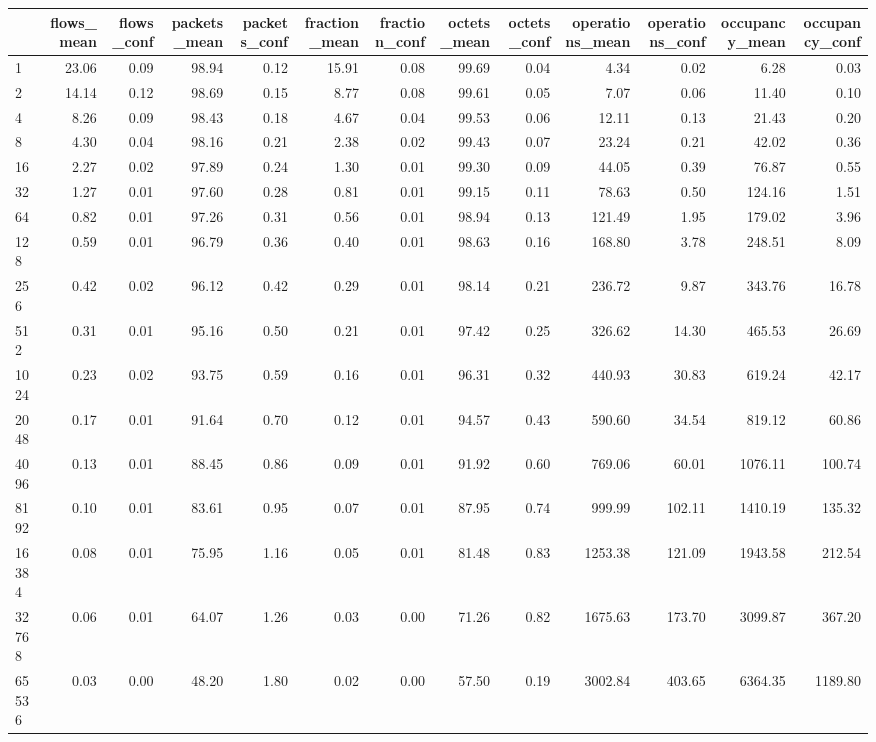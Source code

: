 \begin{tabular}{lrrrrrrrrrrrr}
\toprule
 & flows_mean & flows_conf & packets_mean & packets_conf & fraction_mean & fraction_conf & octets_mean & octets_conf & operations_mean & operations_conf & occupancy_mean & occupancy_conf \\
\midrule
1 & 23.06 & 0.09 & 98.94 & 0.12 & 15.91 & 0.08 & 99.69 & 0.04 & 4.34 & 0.02 & 6.28 & 0.03 \\
2 & 14.14 & 0.12 & 98.69 & 0.15 & 8.77 & 0.08 & 99.61 & 0.05 & 7.07 & 0.06 & 11.40 & 0.10 \\
4 & 8.26 & 0.09 & 98.43 & 0.18 & 4.67 & 0.04 & 99.53 & 0.06 & 12.11 & 0.13 & 21.43 & 0.20 \\
8 & 4.30 & 0.04 & 98.16 & 0.21 & 2.38 & 0.02 & 99.43 & 0.07 & 23.24 & 0.21 & 42.02 & 0.36 \\
16 & 2.27 & 0.02 & 97.89 & 0.24 & 1.30 & 0.01 & 99.30 & 0.09 & 44.05 & 0.39 & 76.87 & 0.55 \\
32 & 1.27 & 0.01 & 97.60 & 0.28 & 0.81 & 0.01 & 99.15 & 0.11 & 78.63 & 0.50 & 124.16 & 1.51 \\
64 & 0.82 & 0.01 & 97.26 & 0.31 & 0.56 & 0.01 & 98.94 & 0.13 & 121.49 & 1.95 & 179.02 & 3.96 \\
128 & 0.59 & 0.01 & 96.79 & 0.36 & 0.40 & 0.01 & 98.63 & 0.16 & 168.80 & 3.78 & 248.51 & 8.09 \\
256 & 0.42 & 0.02 & 96.12 & 0.42 & 0.29 & 0.01 & 98.14 & 0.21 & 236.72 & 9.87 & 343.76 & 16.78 \\
512 & 0.31 & 0.01 & 95.16 & 0.50 & 0.21 & 0.01 & 97.42 & 0.25 & 326.62 & 14.30 & 465.53 & 26.69 \\
1024 & 0.23 & 0.02 & 93.75 & 0.59 & 0.16 & 0.01 & 96.31 & 0.32 & 440.93 & 30.83 & 619.24 & 42.17 \\
2048 & 0.17 & 0.01 & 91.64 & 0.70 & 0.12 & 0.01 & 94.57 & 0.43 & 590.60 & 34.54 & 819.12 & 60.86 \\
4096 & 0.13 & 0.01 & 88.45 & 0.86 & 0.09 & 0.01 & 91.92 & 0.60 & 769.06 & 60.01 & 1076.11 & 100.74 \\
8192 & 0.10 & 0.01 & 83.61 & 0.95 & 0.07 & 0.01 & 87.95 & 0.74 & 999.99 & 102.11 & 1410.19 & 135.32 \\
16384 & 0.08 & 0.01 & 75.95 & 1.16 & 0.05 & 0.01 & 81.48 & 0.83 & 1253.38 & 121.09 & 1943.58 & 212.54 \\
32768 & 0.06 & 0.01 & 64.07 & 1.26 & 0.03 & 0.00 & 71.26 & 0.82 & 1675.63 & 173.70 & 3099.87 & 367.20 \\
65536 & 0.03 & 0.00 & 48.20 & 1.80 & 0.02 & 0.00 & 57.50 & 0.19 & 3002.84 & 403.65 & 6364.35 & 1189.80 \\

\end{tabular}
